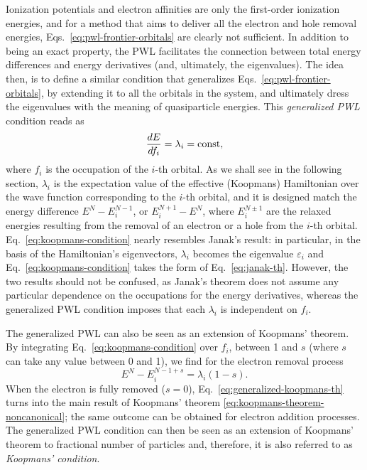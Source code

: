 Ionization potentials and electron affinities are only the first-order ionization energies, and for a method that aims to deliver all the electron and hole removal energies, Eqs.~\eqref{eq:pwl-frontier-orbitals} are clearly not sufficient. In addition to being an exact property, the PWL facilitates the connection between total energy differences and energy derivatives (and, ultimately, the eigenvalues). The idea then, is to define a similar condition that generalizes Eqs.~\eqref{eq:pwl-frontier-orbitals}, by extending it to all the orbitals in the system, and ultimately dress the eigenvalues with the meaning of quasiparticle energies. This \emph{generalized PWL} \cite{dabo_non-koopmans_2009,dabo_koopmans_2010} condition reads as
%
\begin{equation}
    \frac{dE}{df_i} = \lambda_i = {\rm const} ,
    \label{eq:koopmans-condition}
\end{equation}
%
where $f_i$ is the occupation of the $i$-th orbital. As we shall see in the following section, $\lambda_i$ is the expectation value of the effective (Koopmans) Hamiltonian over the wave function corresponding to the $i$-th orbital, and it is designed match the energy difference $E^N - E^{N-1}_i$, or $E^{N+1}_i - E^N$, where $E^{N \pm 1}_i$ are the relaxed energies resulting from the removal of an electron or a hole from the $i$-th orbital. Eq.~\eqref{eq:koopmans-condition} nearly resembles Janak's result: in particular, in the basis of the Hamiltonian's eigenvectors, $\lambda_i$ becomes the eigenvalue $\varepsilon_i$ and Eq.~\eqref{eq:koopmans-condition} takes the form of Eq.~\eqref{eq:janak-th}. However, the two results should not be confused, as Janak's theorem does not assume any particular dependence on the occupations for the energy derivatives, whereas the generalized PWL condition imposes that each $\lambda_i$ is independent on $f_i$.

The generalized PWL can also be seen as an extension of Koopmans' theorem. By integrating Eq.~\eqref{eq:koopmans-condition} over $f_i$, between 1 and $s$ (where $s$ can take any value between 0 and 1), we find for the electron removal process
%
\begin{equation}
    E^N - E^{N-1+s}_i = \lambda_i (1-s) .
    \label{eq:generalized-koopmans-th}
\end{equation}
%
When the electron is fully removed ($s=0$), Eq.~\eqref{eq:generalized-koopmans-th} turns into the main result of Koopmans' theorem \eqref{eq:koopmans-theorem-noncanonical}; the same outcome can be obtained for electron addition processes. The generalized PWL condition can then be seen as an extension of Koopmans' theorem to fractional number of particles and, therefore, it is also referred to as \emph{Koopmans' condition}.

